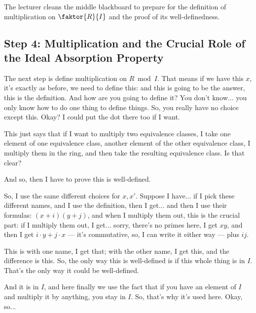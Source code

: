\begin{note}
The lecturer cleans the middle blackboard to prepare for the definition of multiplication on $\faktor{R}{I}$ and the proof of its well-definedness.
\end{note}

\subsection{Step 4: Multiplication and the Crucial Role of the Ideal Absorption Property}

\begin{speech}[00:43:13 - 00:45:11]
The next step is define multiplication on $R \bmod I$.  That means if we have this $x$, it's exactly as before, we need to define this:  and this is going to be the answer, this is the definition. And how are you going to define it? You don't know... you only know how to do one thing to define things. So, you really have no choice except this. Okay? I could put the dot there too if I want. 

This just says that if I want to multiply two equivalence classes, I take one element of one equivalence class, another element of the other equivalence class, I multiply them in the ring, and then take the resulting equivalence class. Is that clear? 

And so, then I have to prove this is well-defined. 

So, I use the same different choices for $x, x'$. Suppose I have... if I pick these different names,  and I use the definition, then I get... and then I use their formulas: $(x + i)(y + j)$,  and when I multiply them out, this is the crucial part: if I multiply them out, I get... sorry, there's no primes here, I get $x y$, and then I get $i \cdot y + j \cdot x$ --- it's commutative, so, I can write it either way --- plus $i j$.  

This is with one name, I get that; with the other name, I get this, and the difference is this. So, the only way this is well-defined is if this whole thing is in $I$.  That's the only way it could be well-defined. 

And it is in $I$, and here finally we use the fact that if you have an element of $I$ and multiply it by anything, you stay in $I$. So, that's why it's used here. Okay, so...
\end{speech}

